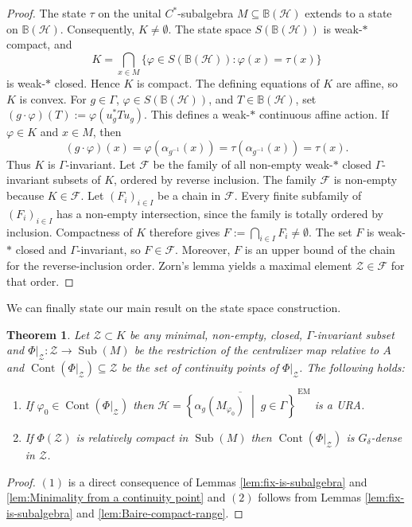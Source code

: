 \documentclass[12pt]{amsart} %
\theoremstyle{plain}
\newtheorem{theorem}{Theorem}[section]
\theoremstyle{definition}
\DeclareMathOperator{\Sub}{Sub}
\begin{document}
\begin{proof}
The state $\tau$ on the unital $C^*$-subalgebra $M\subseteq
\mathbb B(\mathcal H)$ extends to a state on $\mathbb B(\mathcal H)$.
Consequently, $K\neq\emptyset$.  The state space
$S(\mathbb B(\mathcal H))$ is weak-$*$ compact, and
$$
K=\bigcap_{x\in M}
\{\varphi\in S(\mathbb B(\mathcal H)):\varphi(x)=\tau(x)\}
$$
is weak-$*$ closed.  Hence $K$ is compact.  The defining equations of $K$
are affine, so $K$ is convex. For $g\in\Gamma$, $\varphi\in S(\mathbb B(\mathcal H))$, and
$T\in\mathbb B(\mathcal H)$, set $(g\cdot\varphi)(T):=\varphi(u_g^*Tu_g)$. This defines a weak-$*$ continuous affine action.  If $\varphi\in K$ and
$x\in M$, then
$$
(g\cdot\varphi)(x)
=\varphi(\alpha_{g^{-1}}(x))
=\tau(\alpha_{g^{-1}}(x))
=\tau(x).
$$
Thus $K$ is $\Gamma$-invariant.
\medskip
\noindent Let $\mathcal F$ be the family of all non-empty weak-$*$ closed
$\Gamma$-invariant subsets of $K$, ordered by reverse inclusion.  The family
$\mathcal F$ is non-empty because $K\in\mathcal F$.  Let
$(F_i)_{i\in I}$ be a chain in $\mathcal F$.  Every finite subfamily of
$(F_i)_{i\in I}$ has a non-empty intersection, since the family is totally
ordered by inclusion.  Compactness of $K$ therefore gives $F:=\bigcap_{i\in I}F_i\neq\emptyset$. The set $F$ is weak-$*$ closed and $\Gamma$-invariant, so
$F\in\mathcal F$.  Moreover, $F$ is an upper bound of the chain for the
reverse-inclusion order.  Zorn's lemma yields a maximal element
$\mathcal Z\in\mathcal F$ for that order.\end{proof}
\noindent We can finally state our main result on the state space construction.
\begin{theorem}\label{thm:general-ura-construction}
Let $\mathcal{Z}\subset K$ be any minimal, non-empty, closed, $\Gamma$-invariant subset and $\Phi\vert_{\mathcal{Z}}:\mathcal{Z}\to\Sub(M)$ be the restriction of the centralizer map relative to $A$ and $\operatorname{Cont}(\Phi\vert_{\mathcal{Z}})\subseteq\mathcal{Z}$ be the set of continuity points of $\Phi\vert_{\mathcal{Z}}$. The following holds:
\begin{enumerate}
    \item If
$\varphi_0\in\operatorname{Cont}(\Phi\vert_{\mathcal{Z}})$ then $\mathcal{H} = \overline{ \left\{ \alpha_g(M_{\varphi_0}) \;\middle|\; g \in \Gamma \right\} }^{\,\mathrm{EM}}$ is a URA.
\item If $\Phi(\mathcal{Z})$ is relatively compact in $\Sub(M)$ then $\operatorname{Cont}(\Phi\vert_{\mathcal{Z}})$ is $G_\delta$-dense in $\mathcal{Z}$.
\end{enumerate}
\end{theorem}
\begin{proof}
$(1)$ is a direct consequence of Lemmas \ref{lem:fix-is-subalgebra} and \ref{lem:Minimality from a continuity point} and $(2)$ follows from Lemmas \ref{lem:fix-is-subalgebra} and \ref{lem:Baire-compact-range}.
\end{proof}
\end{document}
